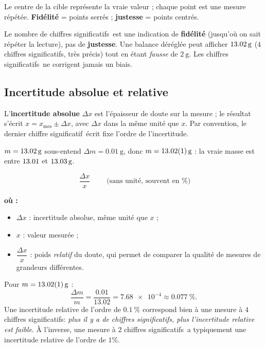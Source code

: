 \documentclass[11pt,a4paper]{article}
\newenvironment{ou}{%
  \par\smallskip\noindent\textbf{où :}\nopagebreak
  \begin{itemize}[leftmargin=1.8em,topsep=2pt,itemsep=1.5pt,parsep=0pt]}%
  {\end{itemize}}
\newcommand{\cs}{chiffre significatif}
\newcommand{\CS}{chiffres significatifs}
\begin{document}
\noindent Le \og centre de la cible\fg{} représente la vraie valeur ; chaque point est une mesure
répétée. \textbf{Fidélité} = points serrés ; \textbf{justesse} = points centrés.

\begin{remarque}
Le nombre de \CS\ est une indication de \textbf{fidélité} (jusqu'où on sait répéter la lecture), pas de
\textbf{justesse}. Une balance déréglée peut afficher $\qty{13{,}02}{\gram}$ ($4$ \CS, très \og précis\fg)
tout en étant \emph{fausse} de $\qty{2}{\gram}$. Les \CS\ ne corrigent jamais un biais.
\end{remarque}

\subsection{Incertitude absolue et relative}

\begin{definition}
L'\textbf{incertitude absolue} $\Delta x$ est l'\og épaisseur de doute\fg{} sur la mesure ; le résultat
s'écrit $x=x_{\text{mes}}\pm\Delta x$, avec $\Delta x$ dans la même unité que $x$. Par convention, le
dernier \cs\ écrit fixe l'ordre de l'incertitude.
\end{definition}

\begin{exemple}
$m=\qty{13{,}02}{\gram}$ sous-entend $\Delta m=\qty{0,01}{\gram}$, donc
$m=\qty{13{,}02\pm0{,}01}{\gram}$ : la vraie masse est entre $\qty{13{,}01}{}$ et $\qty{13{,}03}{\gram}$.
\end{exemple}

\begin{formule}
\[ \boxed{\;\dfrac{\Delta x}{x}\;}\qquad\text{(sans unité, souvent en \%)} \]
\begin{ou}
  \item $\Delta x$ : incertitude absolue, même unité que $x$ ;
  \item $x$ : valeur mesurée ;
  \item $\dfrac{\Delta x}{x}$ : poids \emph{relatif} du doute, qui permet de comparer la qualité de
        mesures de grandeurs différentes.
\end{ou}
\end{formule}

\begin{exemple}
Pour $m=\qty{13{,}02\pm0{,}01}{\gram}$ :
\[ \frac{\Delta m}{m}=\frac{\num{0,01}}{\num{13,02}}=\num{7,68e-4}\approx \qty{0,077}{\percent}. \]
Une incertitude relative de l'ordre de $\qty{0,1}{\percent}$ correspond bien à une mesure à $4$ \CS :
\emph{plus il y a de \CS, plus l'incertitude relative est faible}. À l'inverse, une mesure à $2$ \CS\
a typiquement une incertitude relative de l'ordre de $1\%$.
\end{exemple}
\end{document}
